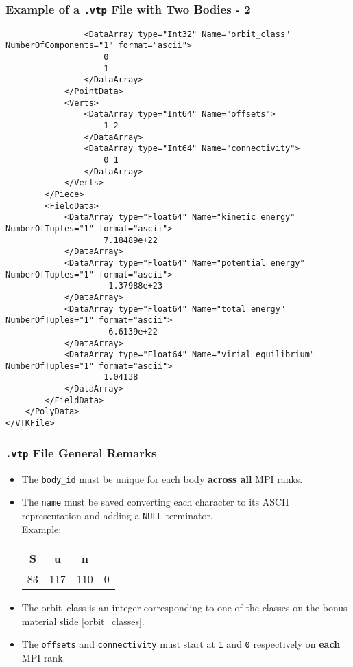 \begin{frame}[fragile]
  \frametitle{Example of a \texttt{.vtp} File with Two Bodies - 2}
  \setfontsize{5.3pt}
    \begin{verbatim}
				<DataArray type="Int32" Name="orbit_class" NumberOfComponents="1" format="ascii">
                    0
                    1
				</DataArray>
			</PointData>
			<Verts>
				<DataArray type="Int64" Name="offsets">
                    1 2 
				</DataArray>
				<DataArray type="Int64" Name="connectivity">
                    0 1 
				</DataArray>
			</Verts>
		</Piece>
		<FieldData>
			<DataArray type="Float64" Name="kinetic energy" NumberOfTuples="1" format="ascii">
                    7.18489e+22
			</DataArray>
			<DataArray type="Float64" Name="potential energy" NumberOfTuples="1" format="ascii">
                    -1.37988e+23
			</DataArray>
			<DataArray type="Float64" Name="total energy" NumberOfTuples="1" format="ascii">
                    -6.6139e+22
			</DataArray>
			<DataArray type="Float64" Name="virial equilibrium" NumberOfTuples="1" format="ascii">
                    1.04138
			</DataArray>
		</FieldData>
	</PolyData>
</VTKFile>
  \end{verbatim}
\end{frame}

\begin{frame}
    \frametitle{\texttt{.vtp} File General Remarks}
    \begin{itemize}
        \item The \texttt{body\_id} must be unique for each body \textbf{across all} MPI ranks.
        \item The \texttt{name} must be saved converting each character to its ASCII representation and adding a \texttt{NULL} terminator. \\[.25em]
        Example:\quad
        \begin{tabular}{|c|c|c|c|}
            \hline
            S & u & n & \\\hline
            83 & 117 & 110 & 0 \\\hline 
        \end{tabular}
        \item The orbit~class is an integer corresponding to one of the classes on the bonus material
        \hyperlink{orbit_classes}{slide \ref{orbit_classes}}.
        \item The \texttt{offsets} and \texttt{connectivity} must start at \texttt{1} and \texttt{0} respectively on \textbf{each} MPI rank.
    \end{itemize}
\end{frame}

